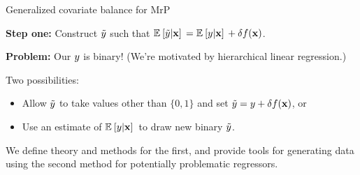 

\begin{frame}[t]{Generalized covariate balance for MrP}

\textbf{Step one:} Construct
$\tilde{y}$ such that $\mathbb{E}_{}\left[ \tilde{y} \vert \mathbf{x}\right]\, = \mathbb{E}_{}\left[ y \vert \mathbf{x}\right]\, + \delta f(\mathbf{x})$.
\pause

\textbf{Problem:} Our $y$ is binary!  (We're motivated by hierarchical linear regression.)

\pause
Two possibilities:
%
\begin{itemize}
    \item Allow $\tilde{y}$ to take values other than $\{0,1\}$ and set
        $\tilde{y} = y + \delta f(\mathbf{x})$, or
    \item Use an estimate of $\mathbb{E}_{}\left[ y \vert \mathbf{x}\right]\,$ to draw new binary $\tilde{y}$.
\end{itemize}
%
We define theory and methods for the first, and provide tools for generating data
using the second method for potentially problematic regressors.


\end{frame}





